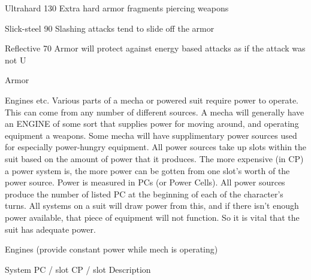 \documentclass[twoside]{book}
\begin{document}
                      
                       Ultrahard   
                       130%
                         Extra hard armor fragments piercing
                         weapons 
                      
                      
                       Slick-steel   
                       90%
                         Slashing attacks tend to slide off the
                         armor 
                      
                      
                       Reflective   
                       70%
                          Armor will protect against energy based
                         attacks as if the attack was not U 
                      
                    
                  Armor  
                  
                
                
                Engines etc.  
                    Various parts of a mecha or powered suit
                   require power to operate. This can come from any
                   number of different sources. A mecha will generally
                   have an ENGINE of some sort that supplies power for
                   moving around, and operating equipment a weapons.
                   Some mecha will have supplimentary power sources used
                   for especially power-hungry equipment. All power
                   sources take up slots within the suit based on the
                   amount of power that it produces. The more expensive
                   (in CP) a power system is, the more power can be
                   gotten from one slot’s worth of the power
                   source. Power is measured in PCs (or Power Cells). All
                   power sources produce the number of listed PC at the
                   beginning of each of the character’s turns. All
                   systems on a suit will draw power from this, and if
                   there isn’t enough power available, that piece
                   of equipment will not function. So it is vital that
                   the suit has adequate power. 
                  
                    Engines (provide constant power while mech is
                     operating)
                    
                      
                       System   
                       PC / slot   
                       CP / slot   
                       Description   
                      
\end{document}
